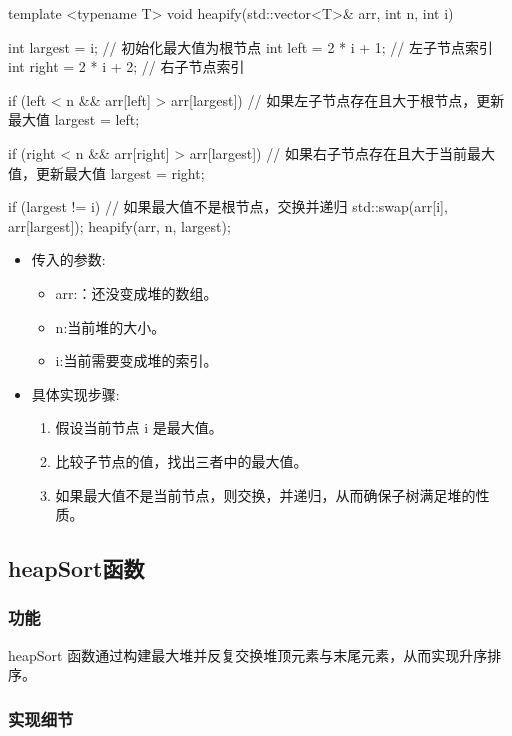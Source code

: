 \documentclass{article}
\begin{document}
    template <typename T>
    void heapify(std::vector<T>\& arr, int n, int i)
    {
        int largest = i; // 初始化最大值为根节点
        int left = 2 * i + 1; // 左子节点索引
        int right = 2 * i + 2; // 右子节点索引

        if (left < n \&\& arr[left] > arr[largest])    // 如果左子节点存在且大于根节点，更新最大值
            largest = left;

        if (right < n \&\& arr[right] > arr[largest])  // 如果右子节点存在且大于当前最大值，更新最大值
            largest = right;

        if (largest != i)                            // 如果最大值不是根节点，交换并递归
        {
            std::swap(arr[i], arr[largest]);
            heapify(arr, n, largest);
        }
    }

    \begin{itemize}
        \item 传入的参数:
        \begin{itemize}
            \item arr:：还没变成堆的数组。
            \item n:当前堆的大小。
            \item i:当前需要变成堆的索引。
        \end{itemize}
        \item 具体实现步骤:
        \begin{enumerate}
            \item 假设当前节点 i 是最大值。
            \item 比较子节点的值，找出三者中的最大值。
            \item 如果最大值不是当前节点，则交换，并递归，从而确保子树满足堆的性质。
        \end{enumerate}
    \end{itemize}

    \subsection{heapSort函数}

    \subsubsection{功能}

    heapSort 函数通过构建最大堆并反复交换堆顶元素与末尾元素，从而实现升序排序。

    \subsubsection{实现细节}
\end{document}
